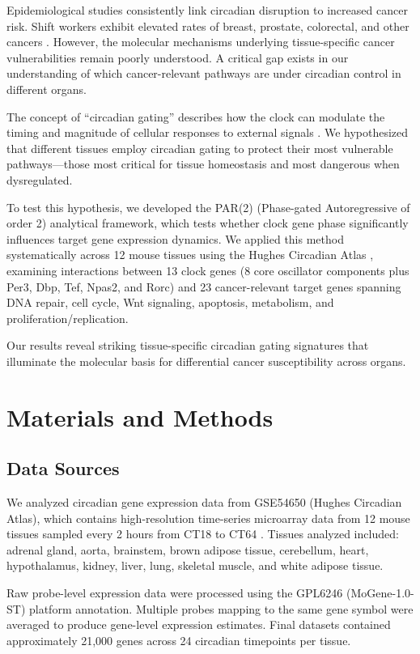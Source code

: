 \documentclass[10pt,letterpaper]{article}
\begin{document}
Epidemiological studies consistently link circadian disruption to increased cancer risk. Shift workers exhibit elevated rates of breast, prostate, colorectal, and other cancers \citep{schernhammer2001, straif2007}. However, the molecular mechanisms underlying tissue-specific cancer vulnerabilities remain poorly understood. A critical gap exists in our understanding of which cancer-relevant pathways are under circadian control in different organs.

The concept of ``circadian gating'' describes how the clock can modulate the timing and magnitude of cellular responses to external signals \citep{janich2021}. We hypothesized that different tissues employ circadian gating to protect their most vulnerable pathways—those most critical for tissue homeostasis and most dangerous when dysregulated.

To test this hypothesis, we developed the PAR(2) (Phase-gated Autoregressive of order 2) analytical framework, which tests whether clock gene phase significantly influences target gene expression dynamics. We applied this method systematically across 12 mouse tissues using the Hughes Circadian Atlas \citep{zhang2014}, examining interactions between 13 clock genes (8 core oscillator components plus Per3, Dbp, Tef, Npas2, and Rorc) and 23 cancer-relevant target genes spanning DNA repair, cell cycle, Wnt signaling, apoptosis, metabolism, and proliferation/replication.

Our results reveal striking tissue-specific circadian gating signatures that illuminate the molecular basis for differential cancer susceptibility across organs.

\section{Materials and Methods}

\subsection{Data Sources}

We analyzed circadian gene expression data from GSE54650 (Hughes Circadian Atlas), which contains high-resolution time-series microarray data from 12 mouse tissues sampled every 2 hours from CT18 to CT64 \citep{zhang2014}. Tissues analyzed included: adrenal gland, aorta, brainstem, brown adipose tissue, cerebellum, heart, hypothalamus, kidney, liver, lung, skeletal muscle, and white adipose tissue.

Raw probe-level expression data were processed using the GPL6246 (MoGene-1.0-ST) platform annotation. Multiple probes mapping to the same gene symbol were averaged to produce gene-level expression estimates. Final datasets contained approximately 21,000 genes across 24 circadian timepoints per tissue.
\end{document}
